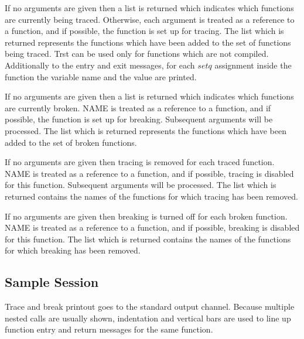 {    If  no  arguments  are  given  then a list is returned which
    indicates  which  functions  are  currently  being   traced.
    Otherwise,  each  argument  is  treated  as a reference to a
    function, and if  possible,  the  function  is  set  up  for
    tracing.    The   list  which  is  returned  represents  the
    functions which have been added  to  the  set  of  functions
    being  traced. Trst can be used only for functions which are
    not compiled. Additionally to the entry and exit messages,
    for each $setq$ assignment inside the function the variable name
    and the value are printed.
}

{    If  no  arguments  are  given  then a list is returned which
    indicates which functions are currently broken.     NAME is
    treated as a reference to a function, and if  possible,  the
    function  is set up for breaking.  Subsequent arguments will
    be processed.  The list which  is  returned  represents  the
    functions  which  have  been  added  to  the  set  of broken
    functions.  
}

{    If no arguments are given then tracing is removed  for  each
    traced  function.   NAME  is  treated  as  a  reference to a
    function, and if possible,  tracing  is  disabled  for  this
    function.  Subsequent arguments will be processed.  The list
    which  is  returned  contains the names of the functions for
    which tracing has been removed.    
}

{    If no arguments are given then breaking is  turned  off  for
    each  broken  function.  NAME is treated as a reference to a
    function, and if possible, breaking  is  disabled  for  this
    function.   The list which is returned contains the names of
    the functions for which breaking  has  been  removed.    
}


\subsection{Sample Session}


  Trace  and break printout goes to the standard output channel.
Because multiple nested calls are usually shown, indentation and
vertical bars are used to line  up  function  entry  and  return
messages for the same function.

